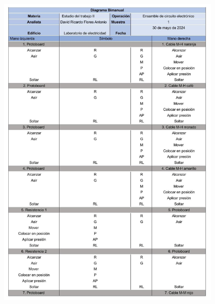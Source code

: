 \begin{figure}[H]
        \centering
        \includegraphics[trim = {0mm 0mm 0mm 0mm},clip,scale=0.2]{10/Img/diagramaBimanual1.jpg}
        \label{diagramaBimanual1}
    \end{figure}


